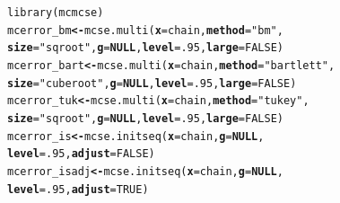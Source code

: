 \documentclass[11pt]{article}\usepackage[]{graphicx}\usepackage[]{color}
\makeatletter
\newcommand{\hlnum}[1]{\textcolor[rgb]{1,0.078,0.576}{#1}}%
\newcommand{\hlstr}[1]{\textcolor[rgb]{1,0.078,0.576}{#1}}%
\newcommand{\hlstd}[1]{\textcolor[rgb]{0,0,0}{#1}}%
\newcommand{\hlkwa}[1]{\textcolor[rgb]{0.18,0.545,0.341}{\textbf{#1}}}%
\newcommand{\hlkwb}[1]{\textcolor[rgb]{0.18,0.545,0.341}{\textbf{#1}}}%
\newcommand{\hlkwc}[1]{\textcolor[rgb]{0.412,0.412,0.412}{\textbf{#1}}}%
\newcommand{\hlkwd}[1]{\textcolor[rgb]{0,0,0.561}{#1}}%
\newenvironment{kframe}{%
 \def\at@end@of@kframe{}%
 \ifinner\ifhmode%
  \def\at@end@of@kframe{\end{minipage}}%
  \begin{minipage}{\columnwidth}%
 \fi\fi%
 \def\FrameCommand##1{\hskip\@totalleftmargin \hskip-\fboxsep
 \colorbox{shadecolor}{##1}\hskip-\fboxsep
     \hskip-\linewidth \hskip-\@totalleftmargin \hskip\columnwidth}%
 \MakeFramed {\advance\hsize-\width
   \@totalleftmargin\z@ \linewidth\hsize
   \@setminipage}}%
 {\par\unskip\endMakeFramed%
 \at@end@of@kframe}
\newenvironment{knitrout}{}{} %
\makeatother
\begin{document}
\begin{knitrout}
\color{fgcolor}\begin{kframe}
\begin{alltt}
\hlkwd{library}\hlstd{(mcmcse)}
\hlstd{mcerror_bm} \hlkwb{<-} \hlkwd{mcse.multi}\hlstd{(}\hlkwc{x} \hlstd{= chain,} \hlkwc{method} \hlstd{=}  \hlstr{"bm"}\hlstd{,}
        \hlkwc{size} \hlstd{=} \hlstr{"sqroot"}\hlstd{,} \hlkwc{g} \hlstd{=} \hlkwa{NULL}\hlstd{,} \hlkwc{level} \hlstd{=} \hlnum{.95}\hlstd{,} \hlkwc{large} \hlstd{=} \hlnum{FALSE}\hlstd{)}
\hlstd{mcerror_bart} \hlkwb{<-} \hlkwd{mcse.multi}\hlstd{(}\hlkwc{x} \hlstd{= chain,} \hlkwc{method} \hlstd{=}  \hlstr{"bartlett"}\hlstd{,}
        \hlkwc{size} \hlstd{=} \hlstr{"cuberoot"}\hlstd{,} \hlkwc{g} \hlstd{=} \hlkwa{NULL}\hlstd{,} \hlkwc{level} \hlstd{=} \hlnum{.95}\hlstd{,} \hlkwc{large} \hlstd{=} \hlnum{FALSE}\hlstd{)}
\hlstd{mcerror_tuk} \hlkwb{<-} \hlkwd{mcse.multi}\hlstd{(}\hlkwc{x} \hlstd{= chain,} \hlkwc{method} \hlstd{=}  \hlstr{"tukey"}\hlstd{,}
        \hlkwc{size} \hlstd{=} \hlstr{"sqroot"}\hlstd{,} \hlkwc{g} \hlstd{=} \hlkwa{NULL}\hlstd{,} \hlkwc{level} \hlstd{=} \hlnum{.95}\hlstd{,} \hlkwc{large} \hlstd{=} \hlnum{FALSE}\hlstd{)}
\hlstd{mcerror_is} \hlkwb{<-} \hlkwd{mcse.initseq}\hlstd{(}\hlkwc{x} \hlstd{= chain,} \hlkwc{g} \hlstd{=} \hlkwa{NULL}\hlstd{,}
                           \hlkwc{level} \hlstd{=} \hlnum{.95}\hlstd{,} \hlkwc{adjust} \hlstd{=} \hlnum{FALSE}\hlstd{)}
\hlstd{mcerror_isadj} \hlkwb{<-} \hlkwd{mcse.initseq}\hlstd{(}\hlkwc{x} \hlstd{= chain,} \hlkwc{g} \hlstd{=} \hlkwa{NULL}\hlstd{,}
                              \hlkwc{level} \hlstd{=} \hlnum{.95}\hlstd{,} \hlkwc{adjust} \hlstd{=} \hlnum{TRUE}\hlstd{)}
\end{alltt}
\end{kframe}
\end{knitrout}
\end{document}
